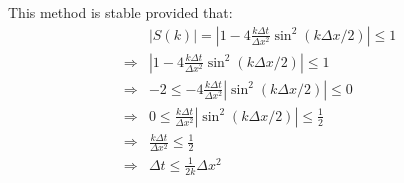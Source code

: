 \documentclass[12pt,a4]{article}
\begin{document}
\begin{enumerate}
    This method is stable provided that:
    \begin{align*}
                  & |S(k)| = |1 - 4\frac{k \Delta t}{\Delta x^2} \sin^2(k\Delta x / 2)| \leq 1\\
      \Rightarrow & |1 - 4\frac{k \Delta t}{\Delta x^2} \sin^2(k\Delta x / 2)| \leq 1\\
      \Rightarrow & -2 \leq - 4\frac{k \Delta t}{\Delta x^2} |\sin^2(k\Delta x / 2)| \leq 0\\
      \Rightarrow & 0 \leq \frac{k \Delta t}{\Delta x^2} |\sin^2(k\Delta x / 2)| \leq \frac{1}{2}\\
      \Rightarrow & \frac{k \Delta t}{\Delta x^2} \leq \frac{1}{2}\\
      \Rightarrow & \Delta t \leq \frac{1}{2 k}\Delta x^2
    \end{align*}
\end{enumerate}
\end{document}
